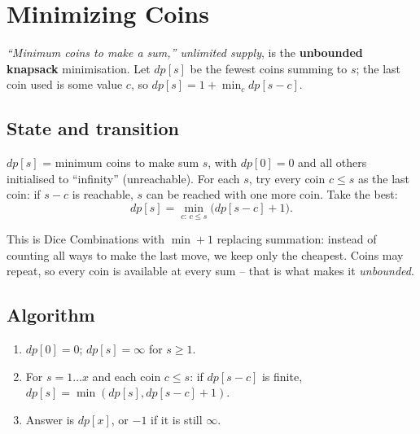 \section{Minimizing Coins}
\label{sec:cses-minimizing-coins}


\begin{patternbox}
\emph{``Minimum coins to make a sum,'' unlimited supply}, is the
\textbf{unbounded knapsack} minimisation. Let $\textit{dp}[s]$ be the
fewest coins summing to $s$; the last coin used is some value $c$, so
$\textit{dp}[s]=1+\min_c \textit{dp}[s-c]$.
\end{patternbox}

\subsection*{State and transition}

$\textit{dp}[s]$ = minimum coins to make sum $s$, with
$\textit{dp}[0]=0$ and all others initialised to ``infinity''
(unreachable). For each $s$, try every coin $c\le s$ as the last coin:
if $s-c$ is reachable, $s$ can be reached with one more coin. Take the
best:
\[
  \textit{dp}[s]=\min_{c:\,c\le s}\big(\textit{dp}[s-c]+1\big).
\]

\begin{ideabox}
This is Dice Combinations with $\min+1$ replacing summation: instead of
counting all ways to make the last move, we keep only the cheapest.
Coins may repeat, so every coin is available at every sum -- that is what
makes it \emph{unbounded}.
\end{ideabox}

\subsection*{Algorithm}

\begin{enumerate}
  \item $\textit{dp}[0]=0$; $\textit{dp}[s]=\infty$ for $s\ge1$.
  \item For $s=1\ldots x$ and each coin $c\le s$: if $\textit{dp}[s-c]$
        is finite, $\textit{dp}[s]=\min(\textit{dp}[s],
        \textit{dp}[s-c]+1)$.
  \item Answer is $\textit{dp}[x]$, or $-1$ if it is still $\infty$.
\end{enumerate}

